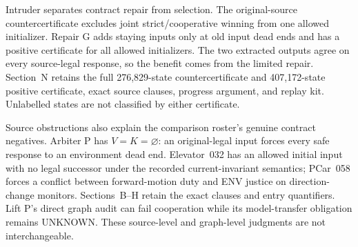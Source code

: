 Intruder separates contract repair from selection. The original-source
countercertificate excludes joint strict/cooperative winning from one
allowed initializer. Repair G adds staying inputs only at old input
dead ends and has a positive certificate for all allowed initializers.
The two extracted outputs agree on every source-legal response, so the
benefit comes from the limited repair. Section~N retains the full
276,829-state countercertificate and 407,172-state positive certificate,
exact source clauses, progress argument, and replay kit. Unlabelled
states are not classified by either certificate.

Source obstructions also explain the comparison roster's genuine
contract negatives. Arbiter P has $V=K=\varnothing$: an original-legal
input forces every safe response to an environment dead end.
Elevator~032 has an allowed initial input with no legal successor under
the recorded current-invariant semantics; PCar~058 forces a conflict
between forward-motion duty and ENV justice on direction-change
monitors. Sections~B--H retain the exact clauses and entry quantifiers.
Lift P's direct graph audit can fail cooperation while its model-transfer
obligation remains UNKNOWN. These source-level and graph-level judgments
are not interchangeable.


